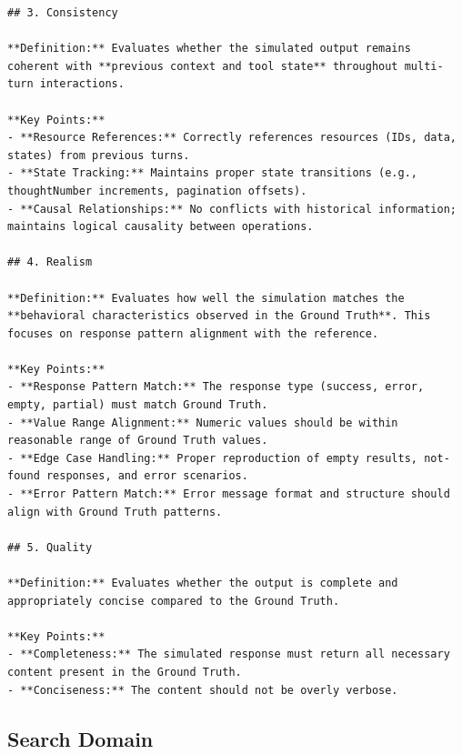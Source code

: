 \documentclass{llmxive}
\begin{document}
\begin{lstlisting}
## 3. Consistency

**Definition:** Evaluates whether the simulated output remains coherent with **previous context and tool state** throughout multi-turn interactions.

**Key Points:**
- **Resource References:** Correctly references resources (IDs, data, states) from previous turns.
- **State Tracking:** Maintains proper state transitions (e.g., thoughtNumber increments, pagination offsets).
- **Causal Relationships:** No conflicts with historical information; maintains logical causality between operations.

## 4. Realism

**Definition:** Evaluates how well the simulation matches the **behavioral characteristics observed in the Ground Truth**. This focuses on response pattern alignment with the reference.

**Key Points:**
- **Response Pattern Match:** The response type (success, error, empty, partial) must match Ground Truth.
- **Value Range Alignment:** Numeric values should be within reasonable range of Ground Truth values.
- **Edge Case Handling:** Proper reproduction of empty results, not-found responses, and error scenarios.
- **Error Pattern Match:** Error message format and structure should align with Ground Truth patterns.

## 5. Quality

**Definition:** Evaluates whether the output is complete and appropriately concise compared to the Ground Truth.

**Key Points:**
- **Completeness:** The simulated response must return all necessary content present in the Ground Truth.
- **Conciseness:** The content should not be overly verbose.
\end{lstlisting}

\subsection{Search Domain}
\label{sec:appendix:judge_search}
\end{document}
